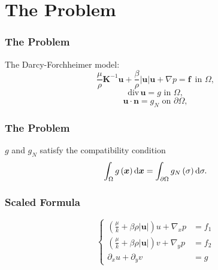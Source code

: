 \documentclass[notheorems,serif]{beamer}
\begin{document}
\section{The Problem}
\begin{frame}
\frametitle{The Problem}
The Darcy-Forchheimer model:
\begin{equation}\label{Eqn::DF equation of the Prob}
\frac{\mu }{\rho }{\boldsymbol{K}^{ - 1}}\boldsymbol{u} + \frac{\beta }{\rho }\left| \boldsymbol{u} \right|\boldsymbol{u} + \nabla p = \boldsymbol{f}\,\,\,\text{in}\,\,\Omega ,
\end{equation}
\begin{equation}\label{Eqn::divergence equation of the Prob}
\text{div}\, \boldsymbol{u} = g\,\,\text{in}\,\,\Omega ,
\end{equation}
\begin{equation}\label{Eqn::N boundary of the Pro}
\boldsymbol{u} \cdot \boldsymbol{n} = {g_N}\,\,\text{on}\,\,{\partial \Omega},
\end{equation}
\end{frame}

\begin{frame}
\frametitle{The Problem}
$ g $ and $ g_N $ satisfy the compatibility condition
\begin{equation}\label{Eqn::compatibility condition}
\int_\Omega  {g\left( \boldsymbol{x} \right)} \, {\rm d}\boldsymbol{x} = \int_{\partial \Omega } {{g_N}\left( \sigma  \right)} \, {\rm d}\sigma .
\end{equation}

\end{frame}

\begin{frame}
\frametitle{Scaled Formula}

\begin{equation}
\left\lbrace
\begin{aligned}
(\frac{\mu}{k} + \beta\rho|\boldsymbol{u}|)u + \nabla_x p & = f_1  \\
(\frac{\mu}{k} + \beta\rho|\boldsymbol{u}|)v + \nabla_y p & = f_2 \\
\partial_x u + \partial_y v & = g 
\end{aligned}\right.
\label{Eqn::scaled formula}
\end{equation}


\end{frame}
\end{document}
